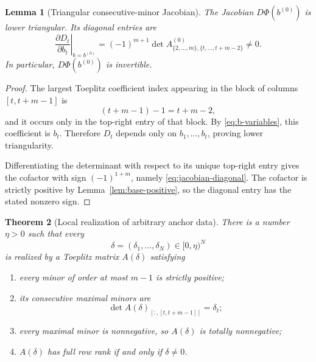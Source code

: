 \documentclass{amsart}
\numberwithin{equation}{section}
\newtheorem{theorem}{Theorem}
\newtheorem{lemma}[theorem]{Lemma}
\theoremstyle{definition}
\theoremstyle{remark}
\begin{document}
\begin{lemma}[Triangular consecutive-minor Jacobian]\label{lem:triangular-jacobian}
The Jacobian $D\Phi(b^{(0)})$ is lower triangular.  Its diagonal entries are
\begin{equation}\label{eq:jacobian-diagonal}
 \left.\frac{\partial D_t}{\partial b_t}\right|_{b=b^{(0)}}
 =(-1)^{m+1}
 \det A^{(0)}_{\{2,\ldots,m\},\{t,\ldots,t+m-2\}}
 \ne0.
\end{equation}
In particular, $D\Phi(b^{(0)})$ is invertible.
\end{lemma}

\begin{proof}
The largest Toeplitz coefficient index appearing in the block of columns $[t,t+m-1]$ is
\[
 (t+m-1)-1=t+m-2,
\]
and it occurs only in the top-right entry of that block.  By \eqref{eq:b-variables}, this coefficient is $b_t$.  Therefore $D_t$ depends only on $b_1,\ldots,b_t$, proving lower triangularity.

Differentiating the determinant with respect to its unique top-right entry gives the cofactor with sign $(-1)^{1+m}$, namely \eqref{eq:jacobian-diagonal}.  The cofactor is strictly positive by Lemma~\ref{lem:base-positive}, so the diagonal entry has the stated nonzero sign.
\end{proof}

\begin{theorem}[Local realization of arbitrary anchor data]\label{thm:local-realization}
There is a number $\eta>0$ such that every
\[
 \delta=(\delta_1,\ldots,\delta_N)\in[0,\eta)^N
\]
is realized by a Toeplitz matrix $A(\delta)$ satisfying
\begin{enumerate}
\item every minor of order at most $m-1$ is strictly positive;
\item its consecutive maximal minors are
\[
 \det A(\delta)_{[:,[t,t+m-1]]}=\delta_t;
\]
\item every maximal minor is nonnegative, so $A(\delta)$ is totally nonnegative;
\item $A(\delta)$ has full row rank if and only if $\delta\ne0$.
\end{enumerate}
\end{theorem}
\end{document}
